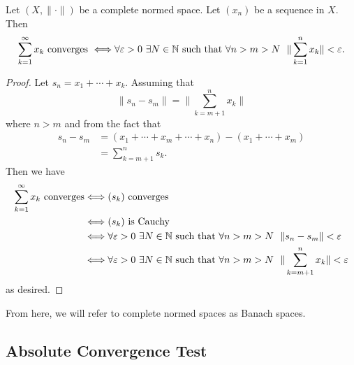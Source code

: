 \documentclass[a4paper]{article}
\begin{document}
\begin{theorem}
    Let \( (X,\|\cdot\|) \) be a complete normed space. Let \( ({x}_{n}) \) be a sequence in \( X  \). Then
    \[  \sum_{ k=1  }^{ \infty  } {x}_{k } \ \text{converges} \ \iff \forall \epsilon > 0 \ \exists N \in \N \ \text{such that} \ \forall n > m > N \ \ \|\sum_{ k=1  }^{ n } {x}_{k } \| < \epsilon. \]
\end{theorem}
\begin{proof}
Let \( {s}_{n} = {x}_{1} + \cdots + {x}_{k} \). Assuming that  
\[  \|{s}_{n} - {s}_{m} \| = \Big\|\sum_{ k=m+1 }^{ n } {x}_{k} \Big\| \]
where \( n > m  \) and from the fact that 
\begin{align*}
    {s}_{n} - {s}_{m} &= ({x}_{1} + \cdots + {x}_{m} + \cdots + {x}_{n}) - ({x}_{1} +  \cdots + {x}_{m}) \\
                      &= \sum_{ k= m+1 }^{ n } {s}_{k}.
\end{align*}
Then we have 
\begin{align*}
    \sum_{ k=1  }^{ \infty  } {x}_{k } \ \text{converges} &\Longleftrightarrow ({s}_{k}) \ \text{converges} \\
                                                          &\Longleftrightarrow ({s}_{k}) \ \text{is Cauchy} \\
                                                          &\Longleftrightarrow \forall \varepsilon > 0 \ \exists N \in \mathbb{N} \ \text{such that} \ \forall n > m > N \  \ \|{s}_{n} - {s}_{m} \| < \varepsilon \\
                                                          &\Longleftrightarrow \forall \varepsilon > 0 \ \exists N \in \mathbb{N} \ \text{such that} \ \forall n > m > N \ \ \|\sum_{ k=m+1 }^{ n } {x}_{k} \| < \varepsilon
\end{align*}
as desired.
\end{proof}

From here, we will refer to complete normed spaces as Banach spaces.

\subsection{Absolute Convergence Test}\label{Absolute Convergence Test}
\end{document}
